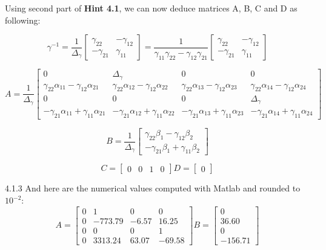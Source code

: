 \documentclass[11pt]{article}
\begin{document}
Using second part of \textbf{Hint 4.1}, we can now deduce matrices A, B, C and D as following:

\begin{equation*}
\gamma^{-1}=
\frac{1}{\Delta_\gamma}
\begin{bmatrix}
\gamma_{22} & -\gamma_{12} \\
-\gamma_{21} & \gamma_{11}
\end{bmatrix}=
\frac{1}{\gamma_{11}\gamma_{22}-\gamma_{12}\gamma_{21}}
\begin{bmatrix}
\gamma_{22} & -\gamma_{12} \\
-\gamma_{21} & \gamma_{11}
\end{bmatrix}
\end{equation*}

\begin{equation*}
A=\frac{1}{\Delta_\gamma}
\begin{bmatrix}
0 & \Delta_\gamma & 0 & 0 \\
\gamma_{22}\alpha_{11}-\gamma_{12}\alpha_{21}&
\gamma_{22}\alpha_{12}-\gamma_{12}\alpha_{22}&
\gamma_{22}\alpha_{13}-\gamma_{12}\alpha_{23}&
\gamma_{22}\alpha_{14}-\gamma_{12}\alpha_{24}\\
0 & 0 & 0 & \Delta_\gamma \\
-\gamma_{21}\alpha_{11}+\gamma_{11}\alpha_{21}&
-\gamma_{21}\alpha_{12}+\gamma_{11}\alpha_{22}&
-\gamma_{21}\alpha_{13}+\gamma_{11}\alpha_{23}&
-\gamma_{21}\alpha_{14}+\gamma_{11}\alpha_{24}
\end{bmatrix}
\end{equation*}

\begin{equation*}
B=\frac{1}{\Delta_\gamma}
\begin{bmatrix}
\gamma_{22}\beta_1-\gamma_{12}\beta_2\\
-\gamma_{21}\beta_1+\gamma_{11}\beta_2
\end{bmatrix}
\end{equation*}

\begin{equation*}
C=
\begin{bmatrix}
0 & 0 & 1 & 0
\end{bmatrix}
D=
\begin{bmatrix}
0
\end{bmatrix}
\end{equation*}

4.1.3 And here are the numerical values computed with Matlab and rounded to $10^{-2}$:
\begin{equation*}
A=
\begin{bmatrix}
0 & 1 & 0 & 0 \\
0 & -773.79 & -6.57 & 16.25 \\
0 & 0 & 0 & 1 \\
0 & 3313.24 & 63.07 & -69.58
\end{bmatrix}
B=
\begin{bmatrix}
0 \\
36.60 \\
0 \\
-156.71
\end{bmatrix}
\end{equation*}
\end{document}
